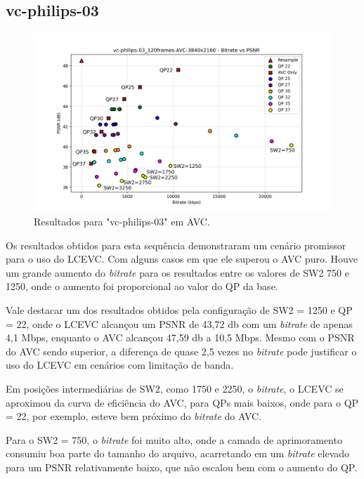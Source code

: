 \newpage

\subsection{vc-philips-03}

\begin{figure}[h]
    \centering
    \includegraphics[width=1.0\textwidth]{img/vc-philips-03_120frames-AVC.png}
    \caption{Resultados para "vc-philips-03" em \acrshort{AVC}.}
    \label{fig:vc-philips-03}
\end{figure}

Os resultados obtidos para esta sequência demonstraram um cenário promissor para
o uso do \acrshort{LCEVC}. Com alguns casos em que ele superou o \acrshort{AVC} puro.
Houve um grande aumento do \textit{bitrate} para os resultados entre os valores de SW2
750 e 1250, onde o aumento foi proporcional ao valor do QP da base.

Vale destacar um dos resultados obtidos pela configuração de SW2 = 1250 e QP = 22, onde
o \acrshort{LCEVC} alcançou um \acrshort{PSNR} de 43,72 db com um \textit{bitrate} 
de apenas 4,1 Mbps, enquanto o \acrshort{AVC} alcançou 47,59 db a 10,5 Mbps. Mesmo
com o \acrshort{PSNR} do \acrshort{AVC} sendo superior, a diferença de quase 2,5 vezes
no \textit{bitrate} pode justificar o uso do \acrshort{LCEVC} em cenários com limitação
de banda.

Em posições intermediárias de SW2, como 1750 e 2250, o \textit{bitrate}, o \acrshort{LCEVC}
se aproximou da curva de eficiência do \acrshort{AVC}, para QPs mais baixos, onde para o QP = 22,
por exemplo, esteve bem próximo do \textit{bitrate} do \acrshort{AVC}.

Para o SW2 = 750, o \textit{bitrate} foi muito alto, onde a camada de aprimoramento
consumiu boa parte do tamanho do arquivo, acarretando em um \textit{bitrate} elevado para um
\acrshort{PSNR} relativamente baixo, que não escalou bem com o aumento do QP.

